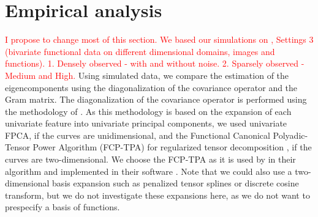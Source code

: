 \section{Empirical analysis} %
\label{sec:empirical_analysis}

\textcolor{red}{I propose to change most of this section. We based our simulations on \cite{happMultivariateFunctionalPrincipal2018a}, Settings 3 (bivariate functional data on different dimensional domains, images and functions). 1. Densely observed - with and without noise. 2. Sparsely observed - Medium and High.}
Using simulated data, we compare the estimation of the eigencomponents using the diagonalization of the covariance operator and the Gram matrix. The diagonalization of the covariance operator is performed using the methodology of \cite{happMultivariateFunctionalPrincipal2018a}. As this methodology is based on the expansion of each univariate feature into univariate principal components, we used univariate FPCA, if the curves are unidimensional, and the Functional Canonical Polyadic-Tensor Power Algorithm (FCP-TPA) for regularized tensor decomposition \citep{allenMultiwayFunctionalPrincipal2013a}, if the curves are two-dimensional. We choose the FCP-TPA as it is used by \cite{happMultivariateFunctionalPrincipal2018a} in their algorithm and implemented in their software \citep{happ-kurzObjectOrientedSoftwareFunctional2020}. Note that we could also use a two-dimensional basis expansion such as penalized tensor splines or discrete cosine transform, but we do not investigate these expansions here, as we do not want to prespecify a basis of functions.

